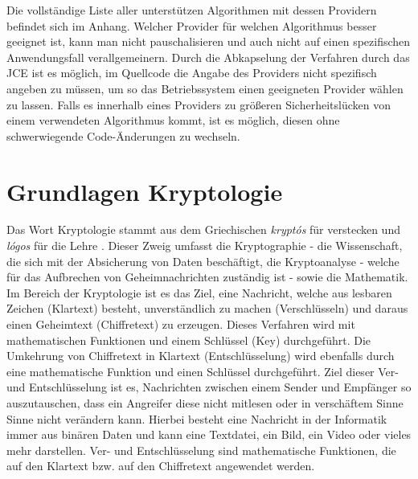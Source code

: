 \documentclass[10pt, a4paper,headsepline]{scrreprt}
\begin{document}
Die vollständige Liste aller unterstützen Algorithmen mit dessen Providern befindet sich im Anhang. Welcher Provider für welchen Algorithmus besser geeignet ist, kann man nicht pauschalisieren und auch nicht auf einen spezifischen Anwendungsfall verallgemeinern. Durch die Abkapselung der Verfahren durch das JCE ist es möglich, im Quellcode die Angabe des Providers nicht spezifisch angeben zu müssen, um so das Betriebssystem einen geeigneten Provider wählen zu lassen. Falls es innerhalb eines Providers zu größeren Sicherheitslücken von einem verwendeten Algorithmus kommt, ist es möglich, diesen ohne schwerwiegende Code-Änderungen zu wechseln. 


\chapter{Grundlagen Kryptologie}
Das Wort Kryptologie stammt aus dem Griechischen \textit{kryptós} für verstecken und \textit{lógos} für die Lehre \cite{website:duden-crypto, website:duden-logie}.
Dieser Zweig umfasst die Kryptographie - die Wissenschaft, die sich mit der Absicherung von Daten beschäftigt, die Kryptoanalyse - welche für das Aufbrechen von Geheimnachrichten zuständig ist - sowie die Mathematik.
Im Bereich der Kryptologie ist es das Ziel, eine Nachricht, welche aus lesbaren Zeichen (Klartext) besteht, unverständlich zu machen (Verschlüsseln) und daraus einen Geheimtext (Chiffretext) zu erzeugen. Dieses Verfahren wird mit mathematischen Funktionen und einem Schlüssel (Key) durchgeführt. Die Umkehrung von Chiffretext in Klartext (Entschlüsselung) wird ebenfalls durch eine mathematische Funktion und einen Schlüssel durchgeführt. Ziel dieser Ver- und Entschlüsselung ist es, Nachrichten zwischen einem Sender und Empfänger so auszutauschen, dass ein Angreifer diese nicht mitlesen oder in verschäftem Sinne Sinne nicht verändern kann. Hierbei besteht eine Nachricht in der Informatik immer aus binären Daten und kann eine Textdatei, ein Bild, ein Video oder vieles mehr darstellen. Ver- und Entschlüsselung sind mathematische Funktionen, die auf den Klartext bzw. auf den Chiffretext angewendet werden. 
\end{document}
